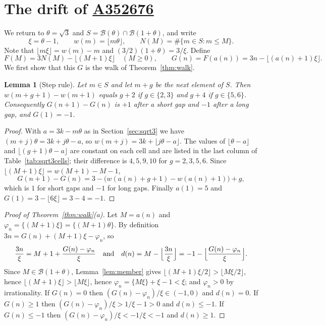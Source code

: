 \documentclass[12pt]{article}
\newcommand{\seqnum}[1]{\href{https://oeis.org/#1}{\underline{#1}}}
\newcommand{\fl}[1]{\lfloor #1 \rfloor}
\newcommand{\B}{\mathcal{B}}
\theoremstyle{plain}
\newtheorem{lemma}[theorem]{Lemma}
\theoremstyle{remark}
\begin{document}
\section{The drift of \texorpdfstring{\seqnum{A352676}}{A352676}}\label{sec:drift}

We return to $\theta=\sqrt3$ and $S=\B(\theta)\cap\B(1+\theta)$, and write
\[
\xi=\theta-1,\qquad w(m)=\fl{m\theta},\qquad N(M)=\#\{m\in S: m\le M\}.
\]
Note that $\fl{m\xi}=w(m)-m$ and $(3/2)(1+\theta)=3/\xi$. Define
\[
F(M)=3N(M)-\fl{(M+1)\xi}\quad(M\ge0),\qquad G(n)=F(a(n))=3n-\fl{(a(n)+1)\xi}.
\]
We first show that this $G$ is the walk of Theorem~\ref{thm:walk}.

\begin{lemma}[Step rule]\label{lem:step}
Let $m\in S$ and let $m+g$ be the next element of $S$. Then
$w(m+g+1)-w(m+1)$ equals $g+2$ if $g\in\{2,3\}$ and $g+4$ if $g\in\{5,6\}$. Consequently
$G(n+1)-G(n)$ is $+1$ after a short gap and $-1$ after a long gap, and $G(1)=-1$.
\end{lemma}

\begin{proof}
With $a=3k-m\theta$ as in Section~\ref{sec:sqrt3} we have $(m+j)\theta=3k+j\theta-a$, so
$w(m+j)=3k+\fl{j\theta-a}$. The values of $\fl{\theta-a}$ and $\fl{(g+1)\theta-a}$ are constant
on each cell and are listed in the last column of Table~\ref{tab:sqrt3cells}; their difference is
$4,5,9,10$ for $g=2,3,5,6$. Since $\fl{(M+1)\xi}=w(M+1)-M-1$,
\[
G(n+1)-G(n)=3-\bigl(w(a(n)+g+1)-w(a(n)+1)\bigr)+g ,
\]
which is $1$ for short gaps and $-1$ for long gaps. Finally $a(1)=5$ and
$G(1)=3-\fl{6\xi}=3-4=-1$.
\end{proof}

\begin{proof}[Proof of Theorem~\ref{thm:walk}(a)]
Let $M=a(n)$ and $\varphi_n=\{(M+1)\xi\}=\{(M+1)\theta\}$. By definition
$3n=G(n)+(M+1)\xi-\varphi_n$, so
\[
\frac{3n}{\xi}=M+1+\frac{G(n)-\varphi_n}{\xi}
\quad\text{and}\quad
d(n)=M-\Bigl\lfloor\frac{3n}{\xi}\Bigr\rfloor=-1-\Bigl\lfloor\frac{G(n)-\varphi_n}{\xi}\Bigr\rfloor .
\]
Since $M\in\B(1+\theta)$, Lemma~\ref{lem:member} gives $\fl{(M+1)\xi/2}>\fl{M\xi/2}$, hence
$\fl{(M+1)\xi}>\fl{M\xi}$, hence $\varphi_n=\{M\xi\}+\xi-1<\xi$; and $\varphi_n>0$ by
irrationality. If $G(n)=0$ then $(G(n)-\varphi_n)/\xi\in(-1,0)$ and $d(n)=0$. If $G(n)\ge1$
then $(G(n)-\varphi_n)/\xi>1/\xi-1>0$ and $d(n)\le-1$. If $G(n)\le-1$ then
$(G(n)-\varphi_n)/\xi<-1/\xi<-1$ and $d(n)\ge1$.
\end{proof}
\end{document}
